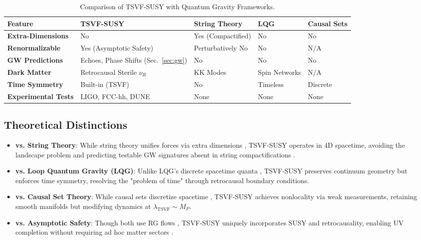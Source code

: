 \documentclass[twocolumn,superscriptaddress,floatfix]{revtex4-2}
\begin{document}
\begin{table}[ht]
\centering
\caption{Comparison of TSVF-SUSY with Quantum Gravity Frameworks.}
\label{tab:qg_comparison}
\begin{tabular}{p{2.0cm} p{1.0cm} p{1.0cm} p{1.0cm} p{1.0cm}}
\toprule
\textbf{Feature} & \textbf{TSVF-SUSY} & \textbf{String Theory} & \textbf{LQG} & \textbf{Causal Sets} \\
\midrule
\textbf{Extra-Dimensions} & No & Yes (Compactified) & No & No \\
\textbf{Renormalizable} & Yes (Asymptotic Safety) & Perturbatively No & No & N/A \\
\textbf{GW Predictions} & Echoes, Phase Shifts (Sec.~\ref{sec:gw}) & No & No & No \\
\textbf{Dark Matter} & Retrocausal Sterile \(\nu_R\) & KK Modes & Spin Networks & N/A \\
\textbf{Time Symmetry} & Built-in (TSVF) & No & Timeless & Discrete \\
\textbf{Experimental Tests} & LIGO, FCC-hh, DUNE & None & None & None \\
\bottomrule
\end{tabular}
\end{table}

\subsection{Theoretical Distinctions}
\label{subsec:theory_distinctions}

\begin{itemize}
\item \textbf{vs. String Theory}: While string theory unifies forces via extra dimensions \cite{Polchinski1998}, TSVF-SUSY operates in 4D spacetime, avoiding the landscape problem \cite{Susskind2003} and predicting testable GW signatures absent in string compactifications \cite{Green2012}.  
\item \textbf{vs. Loop Quantum Gravity (LQG)}: Unlike LQG's discrete spacetime quanta \cite{Rovelli2004}, TSVF-SUSY preserves continuum geometry but enforces time symmetry, resolving the "problem of time" \cite{Kuchar2011} through retrocausal boundary conditions.  
\item \textbf{vs. Causal Set Theory}: While causal sets discretize spacetime \cite{Sorkin2003}, TSVF-SUSY achieves nonlocality via weak measurements, retaining smooth manifolds but modifying dynamics at \( \lambda_{\text{TSVF}} \sim M_P \).  
\item \textbf{vs. Asymptotic Safety}: Though both use RG flows \cite{Reuter1998}, TSVF-SUSY uniquely incorporates SUSY and retrocausality, enabling UV completion without requiring ad hoc matter sectors \cite{Niedermaier2006}.  
\end{itemize}
\end{document}
